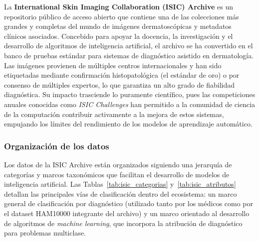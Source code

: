 La \textbf{International Skin Imaging Collaboration (ISIC) Archive} es un repositorio 
público de acceso abierto que contiene una de las colecciones más grandes y completas 
del mundo de imágenes dermatoscópicas y metadatos clínicos asociados. Concebido para 
apoyar la docencia, la investigación y el desarrollo de algoritmos de inteligencia 
artificial, el archivo se ha convertido en el banco de pruebas estándar para sistemas 
de diagnóstico asistido en dermatología. Las imágenes provienen de múltiples centros 
internacionales y han sido etiquetadas mediante confirmación histopatológica (el 
estándar de oro) o por consenso de múltiples expertos, lo que garantiza un alto grado 
de fiabilidad diagnóstica. Su impacto trasciende lo puramente científico, pues las 
competiciones anuales conocidas como \textit{ISIC Challenges} han permitido a la 
comunidad de ciencia de la computación contribuir activamente a la mejora de estos 
sistemas, empujando los límites del rendimiento de los modelos de aprendizaje automático.

\subsubsection{Organización de los datos}

Los datos de la ISIC Archive están organizados siguiendo una jerarquía de categorías 
y marcos taxonómicos que facilitan el desarrollo de modelos de inteligencia artificial. 
Las Tablas~\ref{tab:isic_categorias} y~\ref{tab:isic_atributos} detallan las principales 
vías de clasificación dentro del ecosistema: un marco general de clasificación por 
diagnóstico (utilizado tanto por los médicos como por el dataset HAM10000 integrante 
del archivo) y un marco orientado al desarrollo de algoritmos de \textit{machine learning}, 
que incorpora la atribución de diagnóstico para problemas multiclase.

